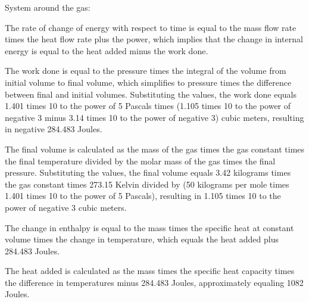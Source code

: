 System around the gas:

The rate of change of energy with respect to time is equal to the mass flow rate times the heat flow rate plus the power, which implies that the change in internal energy is equal to the heat added minus the work done.

The work done is equal to the pressure times the integral of the volume from initial volume to final volume, which simplifies to pressure times the difference between final and initial volumes. Substituting the values, the work done equals 1.401 times 10 to the power of 5 Pascals times (1.105 times 10 to the power of negative 3 minus 3.14 times 10 to the power of negative 3) cubic meters, resulting in negative 284.483 Joules.

The final volume is calculated as the mass of the gas times the gas constant times the final temperature divided by the molar mass of the gas times the final pressure. Substituting the values, the final volume equals 3.42 kilograms times the gas constant times 273.15 Kelvin divided by (50 kilograms per mole times 1.401 times 10 to the power of 5 Pascals), resulting in 1.105 times 10 to the power of negative 3 cubic meters.

The change in enthalpy is equal to the mass times the specific heat at constant volume times the change in temperature, which equals the heat added plus 284.483 Joules.

The heat added is calculated as the mass times the specific heat capacity times the difference in temperatures minus 284.483 Joules, approximately equaling 1082 Joules.